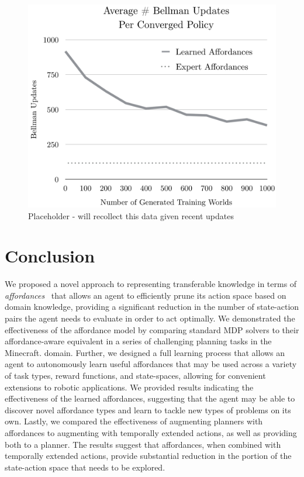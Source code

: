 \documentclass[conference]{IEEEtran}
\begin{document}
\begin{figure}[H]
\centering
\includegraphics[scale=0.195]{figures/training_results.png}%
  \caption{Placeholder - will recollect this data given recent updates}
  \label{fig:training_results}
\end{figure}

\section{Conclusion}
\label{sec:conclusion}

We proposed a novel approach to representing transferable knowledge in terms of
{\em affordances}~\cite{gibson77} that allows an agent to efficiently
prune its action space based on domain knowledge,
providing a significant reduction in the number of state-action pairs the
agent needs to evaluate in order to act optimally. We demonstrated the effectiveness of the affordance model by comparing standard MDP solvers
to their affordance-aware equivalent in a series of challenging planning tasks in the Minecraft.
domain. Further, we designed a full learning process that allows an agent to autonomously learn useful affordances that may be used
across a variety of task types, reward functions, and state-spaces, allowing for convenient extensions to robotic applications.
We provided results indicating the effectiveness of the learned affordances, suggesting that the agent may be able to discover novel affordance types and learn to tackle new types of problems on its own.
Lastly, we compared the effectiveness of augmenting planners with affordances to augmenting with temporally extended actions, as well as providing both to a planner. The results suggest that affordances, when combined with temporally extended actions, provide substantial reduction in the portion of the state-action space that needs to be explored.
\end{document}
